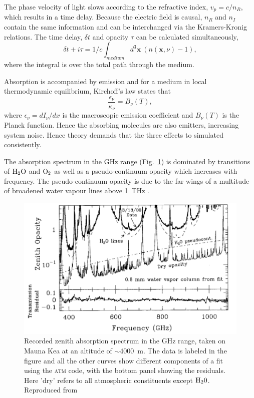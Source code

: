The phase velocity of light slows according to the refractive index, $v_p = c/n_R$, which results in a time delay.  Because the electric field is causal, $n_R$ and $n_I$ contain the same information and can be interchanged via the Kramers-Kronig relations. The time delay, $\delta t$ and opacity $\tau$ can be calculated simultaneously,
\begin{equation}\label{timedelay}
\delta t + i \tau =1/c \int_{medium} d^3\mathbf{x}\  (n(\mathbf{x}, \nu) -1),
\end{equation}
where the integral is over the total path through the medium.


Absorption is accompanied by emission and for a medium in local thermodynamic equilibrium, Kirchoff's law states that 
\begin{equation}\label{kirchoff}
\frac{\epsilon_\nu}{\kappa_\nu}=B_\nu(T),
\end{equation}
where $\epsilon_\nu = dI_\nu/dx$ is the macroscopic emission coefficient and $B_\nu(T)$ is the Planck function. Hence the absorbing molecules are also emitters, increasing system noise. Hence theory demands that the three effects to simulated consistently.


The absorption spectrum in the GHz range (Fig.~\ref{fig:absorption}) is dominated by transitions of $\rm H_2O$ and $\rm O_2$ as well as a pseudo-continuum opacity which increases with frequency. The pseudo-continuum opacity is due to the far wings of a multitude of broadened water vapour lines above 1~THz \citep{Carilli_1999}.  

\begin{figure}
\begin{center}
\includegraphics[width=\columnwidth]{Images/absorption}
\caption{Recorded zenith absorption spectrum in the GHz range, taken on Mauna Kea at an altitude of $\sim 4000$~m. The data is labeled in the figure and all the other curves show different components of a fit using the \textsc{atm} code, with the bottom panel showing the residuals. Here 'dry' refers to all atmospheric constituents except $\rm H_20$. Reproduced from \citet{Pardo_2001} \label{fig:absorption}
}
\end{center}
\end{figure}

